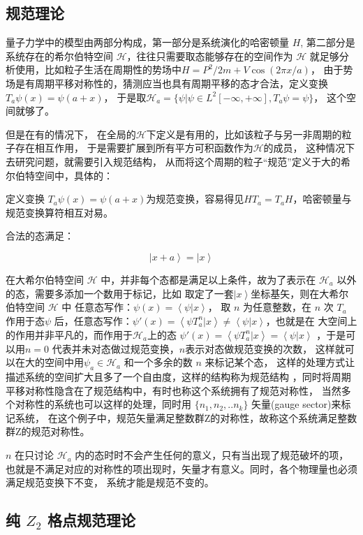 \documentclass[a4paper]{article}
\begin{document}
\subsection{规范理论}

量子力学中的模型由两部分构成，第一部分是系统演化的哈密顿量 $H$, 
第二部分是系统存在的希尔伯特空间 $\mathcal{H}$，往往只需要取态能够存在的空间作为 
$\mathcal{H}$
就足够分析使用，比如粒子生活在周期性的势场中$H = P^2/2m +V\cos(2\pi x/a)$，
由于势场是有周期平移对称性的，猜测应当也具有周期平移的态才合法，定义变换
$T_a \psi(x)=\psi(a+x)$，
于是取$\mathcal{H}_a=\{\psi|\psi\in L^2[-\infty,+\infty], T_a \psi = \psi \}$，
这个空间就够了。



但是在有的情况下，
在全局的$\mathcal{H}$下定义是有用的，比如该粒子与另一非周期的粒子存在相互作用，
于是需要扩展到所有平方可积函数作为$\mathcal{H}$的成员，
这种情况下去研究问题，就需要引入规范结构，
从而将这个周期的粒子“规范”定义于大的希尔伯特空间中，具体的：

定义变换
$T_a \psi(x)=\psi(a+x)$为规范变换，容易得见$H T_a = T_a H$，哈密顿量与规范变换算符相互对易。

合法的态满足：

$$
\left|x+a\right> = \left|x\right>
$$

在大希尔伯特空间 $\mathcal{H}$ 中，并非每个态都是满足以上条件，故为了表示在 $\mathcal{H}_a$ 
以外的态，需要多添加一个数用于标记，比如
取定了一套$\left|x\right>$坐标基矢，则在大希尔伯特空间 $\mathcal{H}$ 中
任意态写作：$\psi(x) = \left<\psi|x\right>$，
取 $n$ 为任意整数，在 $n$ 次 $T_a$ 作用于态$\psi$
后，任意态写作：$\psi'(x) = \left<\psi T_a^n|x\right> \ne \left<\psi|x\right>$，也就是在
大空间上的作用并非平凡的，而作用于$\mathcal{H}_a$上的态
$\psi'(x) = \left<\psi T_a^n|x\right> = \left<\psi|x\right>$
，于是可以用$n=0$ 代表并未对态做过规范变换，$n$表示对态做规范变换的次数，
这样就可以在大的空间中用$\psi_a \in \mathcal{H}_a$ 和一个多余的数 $n$ 来标记某个态，
这样的处理方式让描述系统的空间扩大且多了一个自由度，这样的结构称为规范结构
，同时将周期平移对称性隐含在了规范结构中，有时也称这个系统拥有了规范对称性，
当然多个对称性的系统也可以这样的处理，同时用 $\{n_1,n_2,..n_k\}$ 矢量(gauge sector)来标记系统，
在这个例子中，规范矢量满足整数群Z的对称性，故称这个系统满足整数群Z的规范对称性。

$n$ 在只讨论 $\mathcal{H}_a$ 内的态时时不会产生任何的意义，只有当出现了规范破坏的项，
也就是不满足对应的对称性的项出现时，矢量才有意义。同时，各个物理量也必须满足规范变换下不变，
系统才能是规范不变的。

\subsection{纯 $Z_2$ 格点规范理论}
\end{document}
